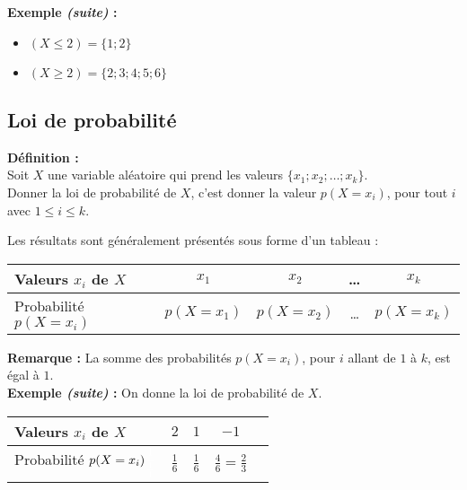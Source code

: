 \documentclass{article}
\begin{document}
\textbf{Exemple \emph{(suite)} :}
\vspace{-4pt}
\begin{itemize}
	\item $(X\leq2) = \{ 1;2 \}$
	\item $(X\geq2) = \{ 2;3;4;5;6 \}$
\end{itemize}

\subsection{Loi de probabilité}

\begin{mdframed}[style=definitionStyle]
	\textbf{Définition :} ~\\
	Soit $X$ une variable aléatoire qui prend les valeurs $\{x_1;x_2;\dots;x_k\}$. \\
	Donner la loi de probabilité de $X$, c'est donner la valeur $p(X=x_i)$, pour tout $i$ avec $1\leq i\leq k$.
	\vspace*{4pt}

	Les résultats sont généralement présentés sous forme d'un tableau : \\
	\vspace*{-8pt}

	\renewcommand{\arraystretch}{1.6}
	\begin{tabular}{|l|c|c|c|c|}
		\hline
		Valeurs $x_i$ de $X$   & $x_1$      & $x_2$      & \quad\text{ }\dots\quad\text{ } & $x_k$      \\
		\hline
		Probabilité $p(X=x_i)$ & $p(X=x_1)$ & $p(X=x_2)$ & \quad\text{ }\dots\quad\text{ } & $p(X=x_k)$ \\
		\hline
	\end{tabular}
\end{mdframed}

\textbf{Remarque :} La somme des probabilités $p(X=x_i)$, pour $i$ allant de $1$ à $k$, est égal à $1$.\\

\textbf{Exemple \emph{(suite)} :} On donne la loi de probabilité de $X$.\\
\renewcommand{\arraystretch}{2}
\begin{tabular}{|l|c|c|c|c|}
	\hline
	Valeurs $x_i$ de $X$                                                     & $2$                        & $1$                        & $-1$                                   \\
	\hline
	Probabilité  $p(X=x_i)\displaystyle{\color{white}\frac{1}{\frac{1}{1}}}$ & $\displaystyle\frac{1}{6}$ & $\displaystyle\frac{1}{6}$ & $\displaystyle\frac{4}{6}=\frac{2}{3}$ \\
	\hline
\end{tabular}
\end{document}
